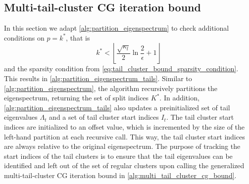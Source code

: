 \subsection{Multi-tail-cluster CG iteration bound}\label{sec:partition_eigenspectrum_tail}
In this section we adapt \cref{alg:partition_eigenspectrum} to check additional conditions on $p=k^*$, that is
\[
    k^* < \left\lfloor\frac{\sqrt{\kappa_l}}{2}\ln{\frac{2}{\epsilon}} + 1 \right\rfloor
\] 
and the sparsity condition from \cref{eq:tail_cluster_bound_sparsity_condition}. This results in \cref{alg:partition_eigenspectrum_tails}. Similar to \cref{alg:partition_eigenspectrum}, the algorithm recursively partitions the eigenspectrum, returning the set of split indices $K^*$. In addition, \cref{alg:partition_eigenspectrum_tails} also updates a preinitialized set of tail eigenvalues $\Lambda_t$ and a set of tail cluster start indices $I_t$. The tail cluster start indices are initialized to an offset value, which is incremented by the size of the left-hand partition at each recursive call. This way, the tail cluster start indices are always relative to the original eigenspectrum. The purpose of tracking the start indices of the tail clusters is to ensure that the tail eigenvalues can be identified and left out of the set of regular clusters upon calling the generalized multi-tail-cluster CG iteration bound in \cref{alg:multi_tail_cluster_cg_bound}.
